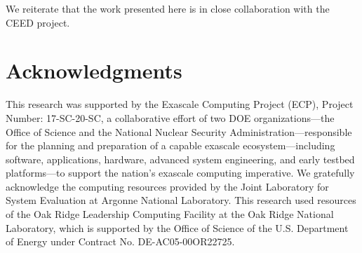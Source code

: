 \documentclass{ecpreportv2}
\begin{document}
We reiterate  that the work presented here is in close collaboration with the CEED project.







\section*{Acknowledgments}

This research was supported by the Exascale Computing Project (ECP), Project
Number: 17-SC-20-SC, a collaborative effort of two DOE organizations---the
Office of Science and the National Nuclear Security Administration---responsible
for the planning and preparation of a capable exascale ecosystem---including
software, applications, hardware, advanced system engineering, and early testbed
platforms---to support the nation's exascale computing imperative. We gratefully
acknowledge the computing resources provided by the Joint Laboratory for System
Evaluation at Argonne National Laboratory. This research used resources of the
Oak Ridge Leadership Computing Facility at the Oak Ridge National Laboratory,
which is supported by the Office of Science of the U.S. Department of Energy
under Contract No. DE-AC05-00OR22725.






\end{document}
